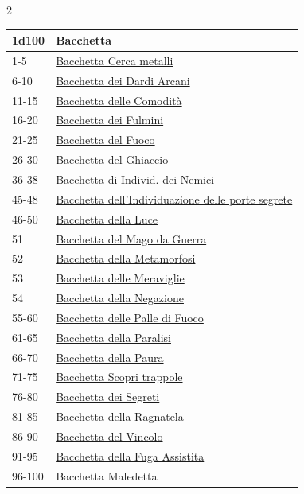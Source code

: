 \begin{multicols}{2}
{{\small\begin{tabularx}{\linewidth}{lX}
		\toprule
\rowcolor{gray!20}\textbf{1d100} & \textbf{Bacchetta}\\
\toprule
1-5 & \hyperlink{Bacchetta Cerca metalli}{Bacchetta Cerca metalli}\\
\rowcolor{gray!20}6-10 & \hyperlink{Bacchetta dei Dardi Arcani}{Bacchetta dei Dardi Arcani}\\
11-15 & \hyperlink{Bacchetta delle Comodità}{Bacchetta delle Comodità}\\
\rowcolor{gray!20}16-20 & \hyperlink{Bacchetta dei Fulmini}{Bacchetta dei Fulmini}\\
21-25 & \hyperlink{Bacchetta del Fuoco}{Bacchetta del Fuoco}\\
\rowcolor{gray!20}26-30 & \hyperlink{Bacchetta del Ghiaccio}{Bacchetta del Ghiaccio}\\
36-38 & \hyperlink{Bacchetta di Individ. dei Nemici}{Bacchetta di Individ. dei Nemici}\\
\rowcolor{gray!20}45-48 & \hyperlink{Bacchetta dell'Individuazione delle porte segrete}{Bacchetta dell'Individuazione delle porte segrete}\\
46-50 & \hyperlink{Bacchetta della Luce}{Bacchetta della Luce}\\
\rowcolor{gray!20}51 & \hyperlink{Bacchetta del Mago da Guerra}{Bacchetta del Mago da Guerra}\\
52 & \hyperlink{Bacchetta della Metamorfosi}{Bacchetta della Metamorfosi}\\
\rowcolor{gray!20}53 & \hyperlink{Bacchetta delle Meraviglie}{Bacchetta delle Meraviglie}\\
54 & \hyperlink{Bacchetta della Negazione}{Bacchetta della Negazione}\\
\rowcolor{gray!20}55-60 & \hyperlink{Bacchetta delle Palle di Fuoco}{Bacchetta delle Palle di Fuoco}\\
61-65 & \hyperlink{Bacchetta della Paralisi}{Bacchetta della Paralisi}\\
\rowcolor{gray!20}66-70 & \hyperlink{Bacchetta della Paura}{Bacchetta della Paura}\\
71-75 & \hyperlink{Bacchetta Scopri trappole}{Bacchetta Scopri trappole}\\
\rowcolor{gray!20}76-80 & \hyperlink{Bacchetta dei Segreti}{Bacchetta dei Segreti}\\
81-85 & \hyperlink{Bacchetta della Ragnatela}{Bacchetta della Ragnatela}\\
\rowcolor{gray!20}86-90 & \hyperlink{Bacchetta del Vincolo}{Bacchetta del Vincolo}\\
91-95 & \hyperlink{Bacchetta della Fuga Assistita}{Bacchetta della Fuga Assistita}\\
\rowcolor{gray!20}96-100 & Bacchetta Maledetta
\end{tabularx}}

}
\end{multicols}
